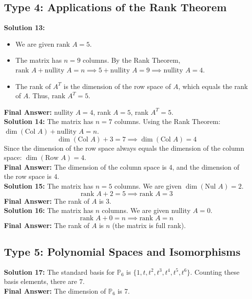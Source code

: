 \documentclass{article}
\begin{document}
\subsection*{Type 4: Applications of the Rank Theorem}
\textbf{Solution 13:}
\begin{itemize}
    \item We are given $\text{rank } A = 5$.
    \item The matrix has $n = 9$ columns. By the Rank Theorem, $\text{rank } A + \text{nullity } A = n \implies 5 + \text{nullity } A = 9 \implies \text{nullity } A = 4$.
    \item The rank of $A^T$ is the dimension of the row space of $A$, which equals the rank of $A$. Thus, $\text{rank } A^T = 5$.
\end{itemize}
\textbf{Final Answer:} nullity $A = 4$, rank $A = 5$, rank $A^T = 5$. \\

\textbf{Solution 14:}
The matrix has $n = 7$ columns. Using the Rank Theorem: $\dim(\text{Col } A) + \text{nullity } A = n$.
$$ \dim(\text{Col } A) + 3 = 7 \implies \dim(\text{Col } A) = 4 $$
Since the dimension of the row space always equals the dimension of the column space: $\dim(\text{Row } A) = 4$. \\
\textbf{Final Answer:} The dimension of the column space is 4, and the dimension of the row space is 4. \\

\textbf{Solution 15:}
The matrix has $n = 5$ columns. We are given $\dim(\text{Nul } A) = 2$.
$$ \text{rank } A + 2 = 5 \implies \text{rank } A = 3 $$
\textbf{Final Answer:} The rank of $A$ is 3. \\

\textbf{Solution 16:}
The matrix has $n$ columns. We are given nullity $A = 0$.
$$ \text{rank } A + 0 = n \implies \text{rank } A = n $$
\textbf{Final Answer:} The rank of $A$ is $n$ (the matrix is full rank). \\

\subsection*{Type 5: Polynomial Spaces and Isomorphisms}
\textbf{Solution 17:}
The standard basis for $\mathbb{P}_6$ is $\{1, t, t^2, t^3, t^4, t^5, t^6\}$. Counting these basis elements, there are 7. \\
\textbf{Final Answer:} The dimension of $\mathbb{P}_6$ is 7. \\
\end{document}
